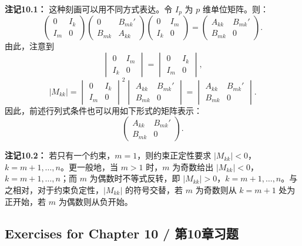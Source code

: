 \begin{translation}
\textbf{注记10.1：} 这种刻画可以用不同方式表达。令 $I_p$ 为 $p$ 维单位矩阵。则：
\[
\begin{pmatrix} 0 & I_k \\ I_m & 0 \end{pmatrix}
\begin{pmatrix} 0 & B_{mk}' \\ B_{mk} & A_{kk} \end{pmatrix}
\begin{pmatrix} 0 & I_m \\ I_k & 0 \end{pmatrix}
= \begin{pmatrix} A_{kk} & B_{mk}' \\ B_{mk} & 0 \end{pmatrix}.
\]
由此，注意到
\[
\begin{vmatrix} 0 & I_m \\ I_k & 0 \end{vmatrix} = \begin{vmatrix} 0 & I_k \\ I_m & 0 \end{vmatrix},
\]
\[
|M_{kk}| = \begin{vmatrix} 0 & I_k \\ I_m & 0 \end{vmatrix}^2
\begin{vmatrix} A_{kk} & B_{mk}' \\ B_{mk} & 0 \end{vmatrix}
= \begin{vmatrix} A_{kk} & B_{mk}' \\ B_{mk} & 0 \end{vmatrix}.
\]
因此，前述行列式条件也可以用如下形式的矩阵表示：
\[
\begin{pmatrix} A_{kk} & B_{mk}' \\ B_{mk} & 0 \end{pmatrix}.
\]

\textbf{注记10.2：} 若只有一个约束，$m=1$，则约束正定性要求 $|M_{kk}| < 0$，$k = m+1,\ldots,n$。更一般地，当 $m>1$ 时，$m$ 为奇数给出 $|M_{kk}| < 0$，$k = m+1,\ldots,n$；而 $m$ 为偶数时不等式反转，即 $|M_{kk}| > 0$，$k = m+1,\ldots,n$。与之相对，对于约束负定性，$|M_{kk}|$ 的符号交替，若 $m$ 为奇数则从 $k = m+1$ 处为正开始，若 $m$ 为偶数则从负开始。
\end{translation}


\subsection*{Exercises for Chapter 10 / 第10章习题}

